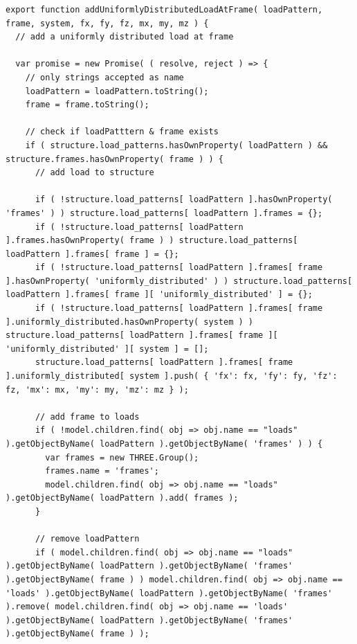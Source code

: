 \begin{lstlisting}[language={},caption=Función \texttt{addUniformlyDistributedLoadAtFrame()} implementada en el archivo \texttt{FEM.js}.,label=alg:FEM.js-addUniformlyDistributedLoadAtFrame, frame=single]
export function addUniformlyDistributedLoadAtFrame( loadPattern, frame, system, fx, fy, fz, mx, my, mz ) {
  // add a uniformly distributed load at frame

  var promise = new Promise( ( resolve, reject ) => {
    // only strings accepted as name
    loadPattern = loadPattern.toString();
    frame = frame.toString();

    // check if loadPatttern & frame exists
    if ( structure.load_patterns.hasOwnProperty( loadPattern ) && structure.frames.hasOwnProperty( frame ) ) {
      // add load to structure

      if ( !structure.load_patterns[ loadPattern ].hasOwnProperty( 'frames' ) ) structure.load_patterns[ loadPattern ].frames = {};
      if ( !structure.load_patterns[ loadPattern ].frames.hasOwnProperty( frame ) ) structure.load_patterns[ loadPattern ].frames[ frame ] = {};
      if ( !structure.load_patterns[ loadPattern ].frames[ frame ].hasOwnProperty( 'uniformly_distributed' ) ) structure.load_patterns[ loadPattern ].frames[ frame ][ 'uniformly_distributed' ] = {};
      if ( !structure.load_patterns[ loadPattern ].frames[ frame ].uniformly_distributed.hasOwnProperty( system ) ) structure.load_patterns[ loadPattern ].frames[ frame ][ 'uniformly_distributed' ][ system ] = [];
      structure.load_patterns[ loadPattern ].frames[ frame ].uniformly_distributed[ system ].push( { 'fx': fx, 'fy': fy, 'fz': fz, 'mx': mx, 'my': my, 'mz': mz } );

      // add frame to loads
      if ( !model.children.find( obj => obj.name == "loads" ).getObjectByName( loadPattern ).getObjectByName( 'frames' ) ) {
        var frames = new THREE.Group();
        frames.name = 'frames';
        model.children.find( obj => obj.name == "loads" ).getObjectByName( loadPattern ).add( frames );
      }

      // remove loadPattern
      if ( model.children.find( obj => obj.name == "loads" ).getObjectByName( loadPattern ).getObjectByName( 'frames' ).getObjectByName( frame ) ) model.children.find( obj => obj.name == 'loads' ).getObjectByName( loadPattern ).getObjectByName( 'frames' ).remove( model.children.find( obj => obj.name == 'loads' ).getObjectByName( loadPattern ).getObjectByName( 'frames' ).getObjectByName( frame ) );


\end{lstlisting}
